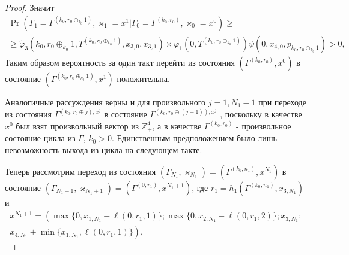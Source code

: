 \documentclass[a4paper,12pt,russian]{extarticle}
\begin{document}
\begin{proof}
Значит
\begin{multline*}
\Pr (\Gamma_{1}=\Gamma^{(k_0,r_0\oplus_{k_0}1)},\varkappa_{1}=x^1 | \Gamma_{0}=\Gamma^{(k_0,r_0)},\varkappa_0=x^0)\geqslant \\
\geqslant \widetilde{\varphi}_3(k_0,r_0\oplus_{k_0}1,T^{(k_0,r_0\oplus_{k_0}1)},x_{3,0},x_{3,1})
\times
\varphi_1(0,T^{(k_0,r_0\oplus_{k_0}1)})  \psi(0,x_{4,0}, p_{k_0,r_0\oplus_{k_0}1}) > 0,
\end{multline*}
Таким образом вероятность за один такт перейти из состояния $(\Gamma^{(k_0,r_0)}, x^0)$ в состояние $ (\Gamma^{(k_0,r_0\oplus_{k_0}1)}, x^1)$ положительна.

Аналогичные рассуждения верны и для произвольного $j=\overline{1,N_1-1}$
при переходе из состояния $\Gamma^{(k_0,r_0\oplus j),x^j}$ в состояние $\Gamma^{(k_0,r_0\oplus(j+1)),x^j}$ , поскольку в качестве $x^0$ был взят произвольный вектор из $\mathbb{Z}_+^4$, а в качестве $\Gamma^{(k_0,r_0)}$ - произвольное состояние цикла из $\Gamma$, $k_0>0$. Единственным предположением было лишь невозможность выхода из цикла на следующем такте.

Теперь рассмотрим переход из состояния $(\Gamma_{N_1},\varkappa_{N_1}) = (\Gamma^{(k_0,n_1)},x^{N_1})$ в состояние $(\Gamma_{N_1+1},\varkappa_{N_1+1}) = (\Gamma^{(0,r_1)},x^{N_1+1})$, где $r_1 = h_1(\Gamma^{(k_0,n_1)},x_{3,N_1})$ и 
\begin{multline*}
x^{N_1+1}=\left(\max{\{0,x_{1,N_1} - \ell(0,r_1,1)\}};
\max{\{0,x_{2,N_1} - \ell(0,r_1,2)\}};x_{3,N_1};\right.\\
\left.
x_{4,N_1} + \min{\{x_{1,N_1}, \ell(0,r_1,1)\}}\right),
\end{multline*}


\end{proof}
\end{document}
